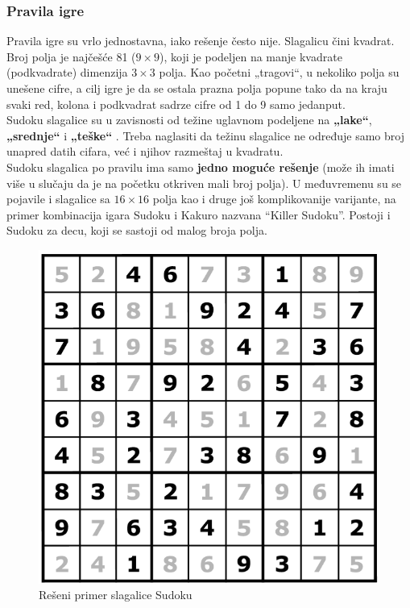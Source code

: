 \documentclass[a4paper]{article}
\begin{document}
\subsubsection{Pravila igre}
Pravila igre su vrlo jednostavna, iako rešenje često nije. Slagalicu čini kvadrat. Broj polja je najčešće 81 ($9\times9$), koji je podeljen na manje kvadrate (podkvadrate) dimenzija $3\times3$ polja. Kao početni „tragovi“, u nekoliko polja su unešene cifre, a cilj igre je da se ostala prazna polja popune tako da na kraju svaki red, kolona i podkvadrat sadrze cifre od 1 do 9 samo jedanput.\\ Sudoku slagalice su u zavisnosti od težine uglavnom podeljene na \textbf{„lake“}, \textbf{„srednje“} i \textbf{„teške“} . Treba naglasiti da težinu slagalice ne određuje samo broj unapred datih cifara, već i njihov razmeštaj u kvadratu.\\
Sudoku slagalica po pravilu ima samo \textbf{jedno moguće rešenje} (može ih imati više u slučaju da je na početku otkriven mali broj polja). U međuvremenu su se pojavile i slagalice sa $16\times16$ polja kao i druge još komplikovanije varijante, na primer kombinacija igara Sudoku i Kakuro nazvana “Killer Sudoku”. Postoji i Sudoku za decu, koji se sastoji od malog broja polja.

\begin{figure}[h]
    \centering
    \includegraphics[scale=0.26]{primer_sudoku_resen.png}
    \caption{Rešeni primer slagalice Sudoku}
    \label{fig:sudokuFull}
\end{figure}
\end{document}
